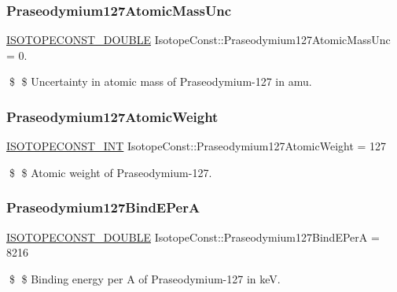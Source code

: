 \subsubsection{\texorpdfstring{Praseodymium127\+Atomic\+Mass\+Unc}{Praseodymium127AtomicMassUnc}}
{\footnotesize\ttfamily \mbox{\hyperlink{group___isotope_const-_macros_ga8f45a7272ce02c0b4c65c44636ed719a}{I\+S\+O\+T\+O\+P\+E\+C\+O\+N\+S\+T\+\_\+\+D\+O\+U\+B\+LE}} Isotope\+Const\+::\+Praseodymium127\+Atomic\+Mass\+Unc = 0.}

\$ \$ Uncertainty in atomic mass of Praseodymium-\/127 in amu. \mbox{\label{group___isotope_const-_praseodymium-_pr127_ga9655a2abd0e82080f4dfef348f86fd4d}} 
\subsubsection{\texorpdfstring{Praseodymium127\+Atomic\+Weight}{Praseodymium127AtomicWeight}}
{\footnotesize\ttfamily \mbox{\hyperlink{group___isotope_const-_macros_ga5f18360b3e99483a35c32d789e62621c}{I\+S\+O\+T\+O\+P\+E\+C\+O\+N\+S\+T\+\_\+\+I\+NT}} Isotope\+Const\+::\+Praseodymium127\+Atomic\+Weight = 127}

\$ \$ Atomic weight of Praseodymium-\/127. \mbox{\label{group___isotope_const-_praseodymium-_pr127_ga3794d5e0d1e4d788529eabf95015e49f}} 
\subsubsection{\texorpdfstring{Praseodymium127\+Bind\+E\+PerA}{Praseodymium127BindEPerA}}
{\footnotesize\ttfamily \mbox{\hyperlink{group___isotope_const-_macros_ga8f45a7272ce02c0b4c65c44636ed719a}{I\+S\+O\+T\+O\+P\+E\+C\+O\+N\+S\+T\+\_\+\+D\+O\+U\+B\+LE}} Isotope\+Const\+::\+Praseodymium127\+Bind\+E\+PerA = 8216}

\$ \$ Binding energy per A of Praseodymium-\/127 in keV. \mbox{\label{group___isotope_const-_praseodymium-_pr127_ga9bff6cbac5c9b9be01c7cbb29d3e630c}} 
